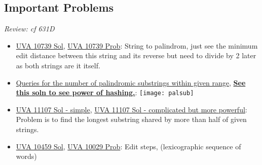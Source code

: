 \documentclass[8pt, a4paper, oneside, twocolumn]{extarticle}
\begin{document}
\subsection{Important Problems}
\textit{Review: cf 631D}
\begin{itemize}
	\item \href {https://github.com/sourabh2311/Competitive-Programming/blob/master/UVA_10739.cpp}{UVA 10739 Sol}, \href {https://uva.onlinejudge.org/external/107/10739.pdf}{UVA 10739 Prob}: String to palindrom, just see the minimum edit distance between this string and its reverse but need to divide by 2 later as both strings are it itself.	
	\item \href {https://codeforces.com/contest/245/problem/H}{Queries for the number of palindromic substrings within given range}, \href {https://github.com/sourabh2311/Competitive-Programming/blob/master/IMP%20QUES/Suffix%20String%20Structure/Hash/514C%20-%20Watto%20And%20Mechanism.cpp}{\textbf {See this soln to see power of hashing.}}: \texttt{[image: palsub]} 	
	\item \href {https://github.com/sourabh2311/Competitive-Programming/blob/master/HimanshuSA11107.cpp}{UVA 11107 Sol - simple}, \href {https://github.com/sourabh2311/Competitive-Programming/blob/master/HimanshuSA11107.cpp}{UVA 11107 Sol - complicated but more powerful}: Problem is to find the longest substring shared by more than half of given strings.	
	\item \href {https://gist.github.com/sourabh2311/25edb7a7067948832ade9192bd2635ce}{UVA 10459 Sol}, \href {https://uva.onlinejudge.org/external/104/10459.pdf}{UVA 10029 Prob}: Edit steps, (lexicographic sequence of words)	
\end{itemize}
\end{document}
